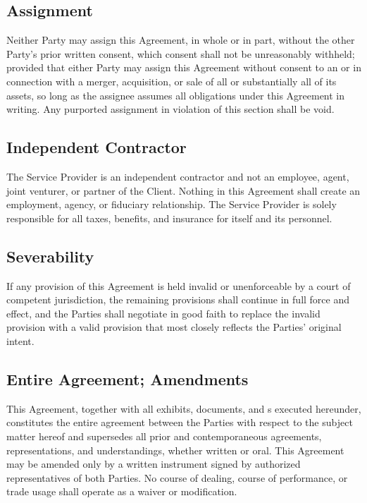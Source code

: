 \subsection{Assignment}
Neither Party may assign this Agreement, in whole or in part, without the other Party's prior written consent, which consent shall not be unreasonably withheld; provided that either Party may assign this Agreement without consent to an  or in connection with a merger, acquisition, or sale of all or substantially all of its assets, so long as the assignee assumes all obligations under this Agreement in writing. Any purported assignment in violation of this section shall be void.

\subsection{Independent Contractor}
The Service Provider is an independent contractor and not an employee, agent, joint venturer, or partner of the Client. Nothing in this Agreement shall create an employment, agency, or fiduciary relationship. The Service Provider is solely responsible for all taxes, benefits, and insurance for itself and its personnel.

\subsection{Severability}
If any provision of this Agreement is held invalid or unenforceable by a court of competent jurisdiction, the remaining provisions shall continue in full force and effect, and the Parties shall negotiate in good faith to replace the invalid provision with a valid provision that most closely reflects the Parties' original intent.

\subsection{Entire Agreement; Amendments}
This Agreement, together with all exhibits,  documents, and s executed hereunder, constitutes the entire agreement between the Parties with respect to the subject matter hereof and supersedes all prior and contemporaneous agreements, representations, and understandings, whether written or oral. This Agreement may be amended only by a written instrument signed by authorized representatives of both Parties. No course of dealing, course of performance, or trade usage shall operate as a waiver or modification.


